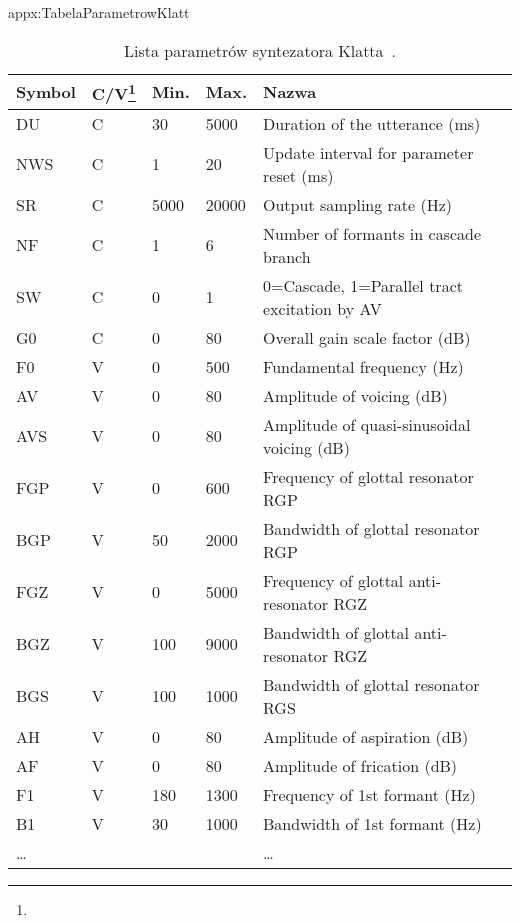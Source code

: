 \begin{zalacznik}{appx:TabelaParametrowKlatt}{\visibletrue}
		\begin{table}[!hbp]
			\centering
			\caption[Lista parametrów syntezatora Klatta]{Lista parametrów syntezatora Klatta~\cite{book:Styger}.}
			\label{tab:TabelaParametrowKlatt}
			\vspace*{6pt}
			\begin{minipage}{\textwidth}
				\centering
				\begin{tabular}{lllll}
					\toprule[1.2pt]
					Symbol & C\slash V\footnote{\objasnienieCV{}} & Min. & Max. & Nazwa \\
					\midrule
					DU & C & 30 & 5000 & Duration of the utterance (ms) \\
					NWS & C & 1 & 20 & Update interval for parameter reset (ms) \\
					SR & C & 5000 & 20000 & Output sampling rate (Hz)  \\
					NF & C & 1 & 6 & Number of formants in cascade branch \\
					SW & C & 0 & 1 & 0=Cascade, 1=Parallel tract excitation by AV \\
					G0 & C & 0 & 80 & Overall gain scale factor (dB) \\
					F0 & V & 0 & 500 & Fundamental frequency (Hz)  \\
					AV & V & 0 & 80 & Amplitude of voicing (dB)  \\
					AVS & V & 0 & 80 & Amplitude of quasi-sinusoidal voicing (dB) \\
					FGP & V & 0 & 600 & Frequency of glottal resonator RGP \\
					BGP & V & 50 & 2000 & Bandwidth of glottal resonator RGP \\
					FGZ & V & 0 & 5000 & Frequency of glottal anti-resonator RGZ \\
					BGZ & V & 100 & 9000 & Bandwidth of glottal anti-resonator RGZ \\
					BGS & V & 100 & 1000 & Bandwidth of glottal resonator RGS \\
					AH & V & 0 & 80 & Amplitude of aspiration (dB)  \\
					AF & V & 0 & 80 & Amplitude of frication (dB)  \\
					F1 & V & 180 & 1300 & Frequency of 1st formant (Hz) \\
					B1 & V & 30 & 1000 & Bandwidth of 1st formant (Hz) \\
					\ldots &&&& \ldots \\

\end{tabular}
\end{minipage}
\end{table}
\end{zalacznik}
